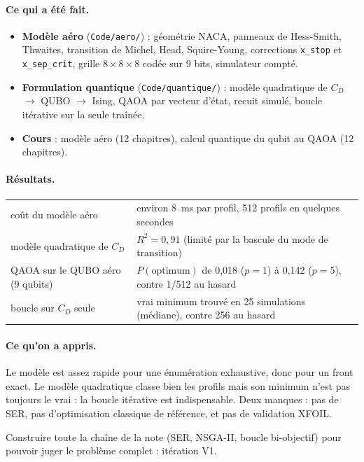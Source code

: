 \documentclass[11pt,a4paper]{report}
\begin{document}
\paragraph{Ce qui a été fait.}
\begin{itemize}
\item \textbf{Modèle aéro} (\texttt{Code/aero/}) : géométrie NACA, panneaux de Hess-Smith, Thwaites, transition de Michel, Head, Squire-Young, corrections \texttt{x\_stop} et \texttt{x\_sep\_crit}, grille $8\times8\times8$ codée sur 9 bits, simulateur compté.
\item \textbf{Formulation quantique} (\texttt{Code/quantique/}) : modèle quadratique de $C_D$ $\to$ QUBO $\to$ Ising, QAOA par vecteur d'état, recuit simulé, boucle itérative sur la seule traînée.
\item \textbf{Cours} : modèle aéro (12 chapitres), calcul quantique du qubit au QAOA (12 chapitres).
\end{itemize}

\paragraph{Résultats.}
\begin{center}
\begin{tabularx}{\linewidth}{lX}
\toprule
coût du modèle aéro & environ 8~ms par profil, 512 profils en quelques secondes \\
modèle quadratique de $C_D$ & $R^2=0{,}91$ (limité par la bascule du mode de transition) \\
QAOA sur le QUBO aéro (9 qubits) & $P(\text{optimum})$ de 0,018 ($p=1$) à 0,142 ($p=5$), contre 1/512 au hasard \\
boucle sur $C_D$ seule & vrai minimum trouvé en 25 simulations (médiane), contre 256 au hasard \\
\bottomrule
\end{tabularx}
\end{center}

\paragraph{Ce qu'on a appris.} Le modèle est assez rapide pour une énumération exhaustive, donc pour un front exact. Le modèle quadratique classe bien les profils mais son minimum n'est pas toujours le vrai : la boucle itérative est indispensable. Deux manques : pas de SER, pas d'optimisation classique de référence, et pas de validation XFOIL.

\begin{decision}
Construire toute la chaîne de la note (SER, NSGA-II, boucle bi-objectif) pour pouvoir juger le problème complet : itération V1.
\end{decision}
\end{document}
